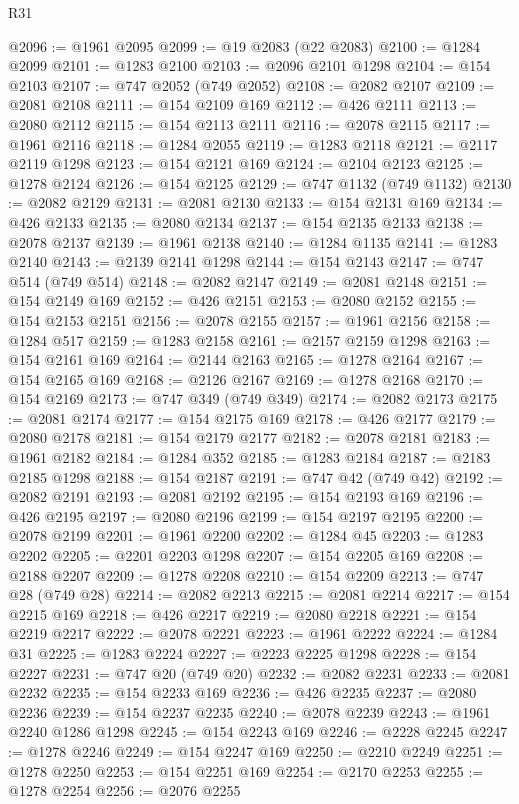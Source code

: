 \begin{lexlean}{R31}
\begin{coremodule}
@2096 := @1961 @2095
@2099 := @19 @2083 (@22 @2083)
@2100 := @1284 @2099
@2101 := @1283 @2100
@2103 := @2096 @2101 @1298
@2104 := @154 @2103
@2107 := @747 @2052 (@749 @2052)
@2108 := @2082 @2107
@2109 := @2081 @2108
@2111 := @154 @2109 @169
@2112 := @426 @2111
@2113 := @2080 @2112
@2115 := @154 @2113 @2111
@2116 := @2078 @2115
@2117 := @1961 @2116
@2118 := @1284 @2055
@2119 := @1283 @2118
@2121 := @2117 @2119 @1298
@2123 := @154 @2121 @169
@2124 := @2104 @2123
@2125 := @1278 @2124
@2126 := @154 @2125
@2129 := @747 @1132 (@749 @1132)
@2130 := @2082 @2129
@2131 := @2081 @2130
@2133 := @154 @2131 @169
@2134 := @426 @2133
@2135 := @2080 @2134
@2137 := @154 @2135 @2133
@2138 := @2078 @2137
@2139 := @1961 @2138
@2140 := @1284 @1135
@2141 := @1283 @2140
@2143 := @2139 @2141 @1298
@2144 := @154 @2143
@2147 := @747 @514 (@749 @514)
@2148 := @2082 @2147
@2149 := @2081 @2148
@2151 := @154 @2149 @169
@2152 := @426 @2151
@2153 := @2080 @2152
@2155 := @154 @2153 @2151
@2156 := @2078 @2155
@2157 := @1961 @2156
@2158 := @1284 @517
@2159 := @1283 @2158
@2161 := @2157 @2159 @1298
@2163 := @154 @2161 @169
@2164 := @2144 @2163
@2165 := @1278 @2164
@2167 := @154 @2165 @169
@2168 := @2126 @2167
@2169 := @1278 @2168
@2170 := @154 @2169
@2173 := @747 @349 (@749 @349)
@2174 := @2082 @2173
@2175 := @2081 @2174
@2177 := @154 @2175 @169
@2178 := @426 @2177
@2179 := @2080 @2178
@2181 := @154 @2179 @2177
@2182 := @2078 @2181
@2183 := @1961 @2182
@2184 := @1284 @352
@2185 := @1283 @2184
@2187 := @2183 @2185 @1298
@2188 := @154 @2187
@2191 := @747 @42 (@749 @42)
@2192 := @2082 @2191
@2193 := @2081 @2192
@2195 := @154 @2193 @169
@2196 := @426 @2195
@2197 := @2080 @2196
@2199 := @154 @2197 @2195
@2200 := @2078 @2199
@2201 := @1961 @2200
@2202 := @1284 @45
@2203 := @1283 @2202
@2205 := @2201 @2203 @1298
@2207 := @154 @2205 @169
@2208 := @2188 @2207
@2209 := @1278 @2208
@2210 := @154 @2209
@2213 := @747 @28 (@749 @28)
@2214 := @2082 @2213
@2215 := @2081 @2214
@2217 := @154 @2215 @169
@2218 := @426 @2217
@2219 := @2080 @2218
@2221 := @154 @2219 @2217
@2222 := @2078 @2221
@2223 := @1961 @2222
@2224 := @1284 @31
@2225 := @1283 @2224
@2227 := @2223 @2225 @1298
@2228 := @154 @2227
@2231 := @747 @20 (@749 @20)
@2232 := @2082 @2231
@2233 := @2081 @2232
@2235 := @154 @2233 @169
@2236 := @426 @2235
@2237 := @2080 @2236
@2239 := @154 @2237 @2235
@2240 := @2078 @2239
@2243 := @1961 @2240 @1286 @1298
@2245 := @154 @2243 @169
@2246 := @2228 @2245
@2247 := @1278 @2246
@2249 := @154 @2247 @169
@2250 := @2210 @2249
@2251 := @1278 @2250
@2253 := @154 @2251 @169
@2254 := @2170 @2253
@2255 := @1278 @2254
@2256 := @2076 @2255

\end{coremodule}
\end{lexlean}
